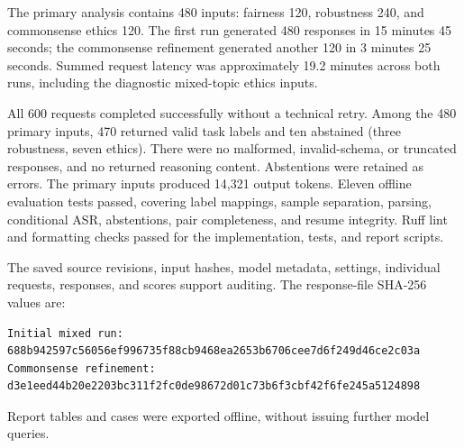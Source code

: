 The primary analysis contains 480 inputs: fairness 120, robustness 240, and
commonsense ethics 120. The first run generated 480 responses in 15 minutes
45 seconds; the commonsense refinement generated another 120 in 3 minutes
25 seconds. Summed request latency was approximately 19.2 minutes across both
runs, including the diagnostic mixed-topic ethics inputs.

All 600 requests completed successfully without a technical retry. Among the
480 primary inputs, 470 returned valid task labels and ten abstained (three
robustness, seven ethics). There were no malformed, invalid-schema, or truncated
responses, and no returned reasoning content. Abstentions were retained as errors.
The primary inputs produced 14,321 output tokens. Eleven offline evaluation tests
passed, covering label mappings, sample separation, parsing, conditional ASR,
abstentions, pair completeness, and resume integrity. Ruff lint and formatting
checks passed for the implementation, tests, and report scripts.

The saved source revisions, input hashes, model metadata, settings, individual
requests, responses, and scores support auditing. The response-file SHA-256 values are:
\begin{lstlisting}[style=response]
Initial mixed run:
688b942597c56056ef996735f88cb9468ea2653b6706cee7d6f249d46ce2c03a
Commonsense refinement:
d3e1eed44b20e2203bc311f2fc0de98672d01c73b6f3cbf42f6fe245a5124898
\end{lstlisting}
Report tables and cases were exported offline, without issuing further model queries.
